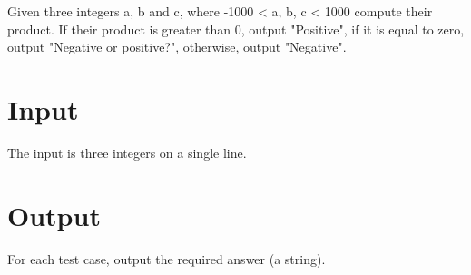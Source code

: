 
Given three integers a, b and c, where -1000 < a, b, c < 1000 compute their product. If their product is greater than 0, output "Positive", if it is equal to zero, output "Negative or positive?", otherwise, output "Negative".

\section*{Input}

The input is three integers on a single line.

\section*{Output}

For each test case, output the required answer (a string).
